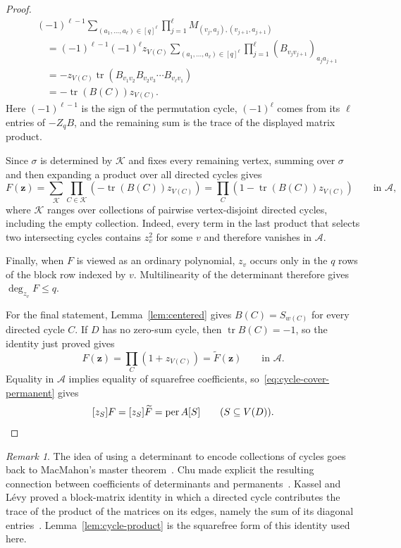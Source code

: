 \documentclass[11pt]{amsart}
\theoremstyle{remark}
\newtheorem*{remark}{Remark}
\newcommand{\per}{\operatorname{per}}
\newcommand{\tr}{\operatorname{tr}}
\begin{document}
\begin{proof}
\[
\begin{aligned}
  &(-1)^{\ell-1}
  \sum_{(a_1,\ldots,a_\ell)\in[q]^\ell}
  \prod_{j=1}^{\ell}
  M_{(v_j,a_j),(v_{j+1},a_{j+1})}\\
  &\quad=(-1)^{\ell-1}(-1)^\ell z_{V(C)}
  \sum_{(a_1,\ldots,a_\ell)\in[q]^\ell}
  \prod_{j=1}^{\ell}
  (B_{v_jv_{j+1}})_{a_ja_{j+1}}\\
  &\quad=
  -z_{V(C)}
  \tr\left(B_{v_1v_2}B_{v_2v_3}\cdots B_{v_\ell v_1}\right)\\
  &\quad=
  -\tr(B(C))z_{V(C)}.
\end{aligned}
\]
Here $(-1)^{\ell-1}$ is the sign of the permutation cycle,
$(-1)^\ell$ comes from its $\ell$ entries of $-Z_qB$, and the remaining
sum is the trace of the displayed matrix product.

Since $\sigma$ is determined by $\mathcal K$ and fixes every remaining
vertex, summing over $\sigma$ and then expanding a product over all
directed cycles gives
\[
  F(\mathbf z)
  =
  \sum_{\mathcal K}
  \prod_{C\in\mathcal K}
  \left(-\tr(B(C))z_{V(C)}\right)
  =
  \prod_C\left(1-\tr(B(C))z_{V(C)}\right)
  \qquad\text{in }\mathcal A,
\]
where $\mathcal K$ ranges over collections of pairwise vertex-disjoint
directed cycles, including the empty collection.  Indeed, every term
in the last product that selects two intersecting cycles contains
$z_v^2$ for some $v$ and therefore vanishes in $\mathcal A$.

Finally, when $F$ is viewed as an ordinary polynomial, $z_v$ occurs
only in the $q$ rows of the block row indexed by $v$.  Multilinearity
of the determinant therefore gives $\deg_{z_v}F\le q$.

For the final statement, Lemma~\ref{lem:centered} gives
$B(C)=S_{w(C)}$ for every directed cycle $C$.  If $D$ has no zero-sum
cycle, then $\tr B(C)=-1$, so the identity just proved gives
\[
  F(\mathbf z)=\prod_C(1+z_{V(C)})
  =\widetilde F(\mathbf z)
  \qquad\text{in }\mathcal A.
\]
Equality in $\mathcal A$ implies equality of squarefree coefficients,
so~\eqref{eq:cycle-cover-permanent} gives
\[
  [z_S]F=[z_S]\widetilde F=\per A[S]
  \qquad(S\subseteq V(D)).\qedhere
\]
\end{proof}

\begin{remark}
The idea of using a determinant to encode collections of cycles goes
back to MacMahon's master theorem~\cite{MacMahon}.  Chu made explicit
the resulting connection between coefficients of determinants and
permanents~\cite{Chu}.  Kassel and L\'evy proved a block-matrix identity
in which a directed cycle contributes the trace of the product of the
matrices on its edges, namely the sum of its diagonal
entries~\cite[Theorem~3.1]{KasselLevy}.  Lemma~\ref{lem:cycle-product} is
the squarefree form of this identity used here.
\end{remark}
\end{document}
